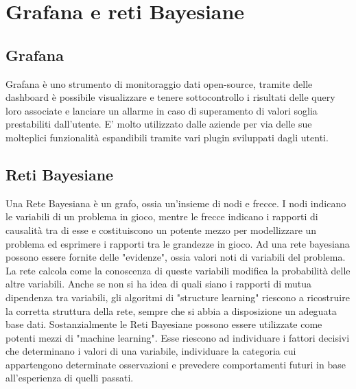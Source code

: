 \section{Grafana e reti Bayesiane}
		\subsection{Grafana}			
Grafana è uno strumento di monitoraggio dati open-source, tramite delle dashboard è possibile visualizzare e tenere sottocontrollo i risultati delle query loro associate e lanciare un allarme in caso di superamento di valori soglia prestabiliti dall'utente. E' molto utilizzato dalle aziende per via delle sue molteplici funzionalità  espandibili tramite vari plugin sviluppati dagli utenti.


		\subsection{Reti Bayesiane}
Una Rete Bayesiana è un grafo, ossia un'insieme di nodi e frecce. I nodi
indicano le variabili di un problema in gioco, mentre le frecce indicano i
rapporti di causalità tra di esse e costituiscono un potente mezzo per
modellizzare un problema ed esprimere i rapporti tra le grandezze in gioco.
Ad una rete bayesiana possono essere fornite delle "evidenze", ossia valori noti di variabili del problema. 
La rete calcola come la conoscenza di queste variabili modifica la probabilità  delle altre variabili.
Anche se non si ha idea di quali siano i rapporti di mutua dipendenza tra
variabili, gli algoritmi di "structure learning" riescono a ricostruire la corretta struttura della rete, sempre che si abbia a disposizione un adeguata base dati.
Sostanzialmente le Reti Bayesiane possono essere utilizzate come potenti mezzi
di "machine learning". Esse riescono ad individuare i fattori decisivi che
determinano i valori di una variabile, individuare la categoria cui appartengono determinate osservazioni e prevedere comportamenti futuri in base all'esperienza di quelli passati.


\newpage
